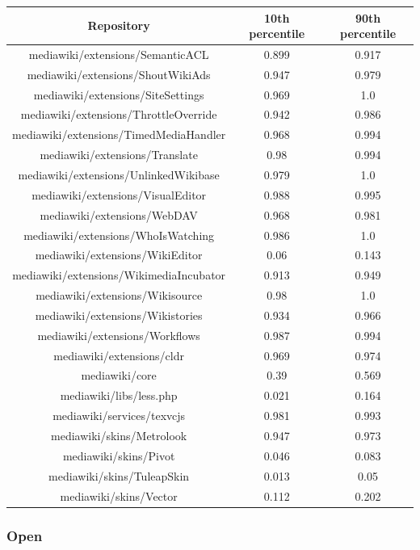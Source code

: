 \begin{table}[H]
    \centering
    \begin{tabular}{@{}c c c@{}} 
    \hline
    \textbf{Repository} & \textbf{10th percentile} & \textbf{90th percentile} \\
    \hline
mediawiki/extensions/SemanticACL & 0.899 & 0.917 \\
mediawiki/extensions/ShoutWikiAds & 0.947 & 0.979 \\
mediawiki/extensions/SiteSettings & 0.969 & 1.0 \\
mediawiki/extensions/ThrottleOverride & 0.942 & 0.986 \\
mediawiki/extensions/TimedMediaHandler & 0.968 & 0.994 \\
mediawiki/extensions/Translate & 0.98 & 0.994 \\
mediawiki/extensions/UnlinkedWikibase & 0.979 & 1.0 \\
mediawiki/extensions/VisualEditor & 0.988 & 0.995 \\
mediawiki/extensions/WebDAV & 0.968 & 0.981 \\
mediawiki/extensions/WhoIsWatching & 0.986 & 1.0 \\
mediawiki/extensions/WikiEditor & 0.06 & 0.143 \\
mediawiki/extensions/WikimediaIncubator & 0.913 & 0.949 \\
mediawiki/extensions/Wikisource & 0.98 & 1.0 \\
mediawiki/extensions/Wikistories & 0.934 & 0.966 \\
mediawiki/extensions/Workflows & 0.987 & 0.994 \\
mediawiki/extensions/cldr & 0.969 & 0.974 \\
mediawiki/core & 0.39 & 0.569 \\
mediawiki/libs/less.php & 0.021 & 0.164 \\
mediawiki/services/texvcjs & 0.981 & 0.993 \\
mediawiki/skins/Metrolook & 0.947 & 0.973 \\
mediawiki/skins/Pivot & 0.046 & 0.083 \\
mediawiki/skins/TuleapSkin & 0.013 & 0.05 \\
mediawiki/skins/Vector & 0.112 & 0.202 \\
    \hline
\end{tabular}
    \label{table:accuracy-score-merged-appendix-c-part-4}
\end{table}

\subsubsection{Open}

